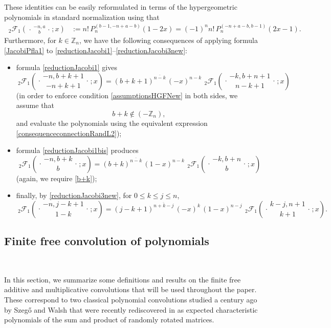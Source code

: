 \documentclass[reqno,11pt]{amsart}
\theoremstyle{remark}
\newcommand{\Z}{\mathbb{Z}}
\newcommand{\raising}[2]{\left(#1\right)^{\overline{#2}}}
\newcommand*\pFq[5]{%
 {\ }_{#1}{\mathcal F}_{#2}{\left(\genfrac..{0pt}{}{#3}{#4};#5\right)}%
}
\begin{document}
These identities can be easily reformulated in terms of the hypergeometric polynomials in standard normalization using that
\begin{align} \label{HPJacobiPfla1}
\pFq{ 2}{1}{-n, a}{b }{x} 
&:=  n!  \, P^{(b-1,-n+a-b)}_{n}(1-2x) =(-1)^n  n! \, P^{(-n+a-b,b-1)}_{n}(2x-1) .
\end{align}
Furthermore, for $k\in \Z_n  $, we have the following consequences of applying formula  \eqref{JacobiPfla1} to \eqref{reductionJacobi1}--\eqref{reductionJacobi3new}:
\begin{itemize}
\item formula \eqref{reductionJacobi1} gives
\begin{equation}
    \label{2ndreduction2F1}
\pFq{2}{1}{-n, b + k+1}{-n+k+1}{x}
        = \raising{b+k+1}{n-k} \, (-x)^{n-k} \, \pFq{2}{1}{-k, b + n+1}{n-k+1}{x}   
\end{equation}
(in order to enforce condition \eqref{assumptionsHGFNew} in both sides, we assume that
\begin{equation}
    \label{b+k}
  b+k \notin (-\Z_n),  
\end{equation}
and evaluate the polynomials using the equivalent expression \eqref{consequenceconnectionRandL2});
 \item formula \eqref{reductionJacobi1bis} produces
    \begin{equation}
    \label{reduction2F1}
\pFq{2}{1}{-n, b + k}{b}{x}
        =  \raising{b+k}{n-k} \, (1-x)^{n-k} \, \pFq{2}{1}{-k, b + n}{b}{x}   
\end{equation}
(again, we require \eqref{b+k}); 

\item finally, by \eqref{reductionJacobi3new},  for $0\le k \le j \le n$,
  \begin{equation}
    \label{reduction2F14bis}
\pFq{2}{1}{-n, j-k+1}{1-k}{x}
        =   \raising{j-k+1}{n+k-j}\,(-x)^{k}\,(1-x)^{n-j}  \, \pFq{2}{1}{k-j, n+1}{k+1}{x}  . 
\end{equation}
\end{itemize} 
 

\subsection{Finite free convolution of polynomials} \label{sec:freeconvol} \

In this section, we summarize some definitions and results on the finite free additive and multiplicative convolutions that will be used throughout the paper. These correspond to two classical polynomial convolutions studied a century ago by Szeg\H{o} \cite{szego1922} and Walsh \cite{Walsh1922} that were recently rediscovered in \cite{MR4408504} as expected characteristic polynomials of the sum and product of randomly rotated matrices. 
\end{document}
